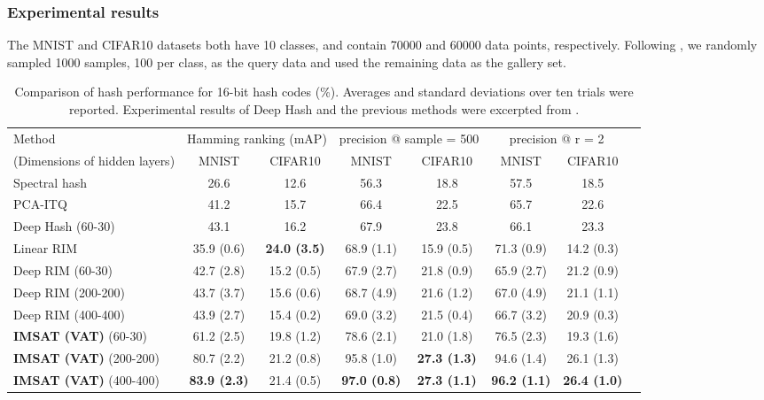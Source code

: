 \documentclass{article}
\theoremstyle{plain}
\begin{document}
\subsubsection{Experimental results} \label{sec:exp_hashing}
The MNIST and CIFAR10 datasets both have 10 classes, and contain 70000 and 60000 data points, respectively. 
Following \citet{erin2015deep}, we randomly sampled 1000 samples, 100 per class, as the query data and used the remaining data as the gallery set. 

\begin{table*}[t] 
\begin{center}
\caption{Comparison of hash performance for 16-bit hash codes (\%). Averages and standard deviations over ten trials were reported. Experimental results of Deep Hash and the previous methods were excerpted from \citet{erin2015deep}.}
\begin{tabular}{|l||c|c|c|c|c|c|c|}\hline
Method & \multicolumn{2}{|c|}{Hamming ranking (mAP)} &\multicolumn{2}{|c|}{precision @ sample = 500} & \multicolumn{2}{|c|}{precision @ r = 2} \\ \cline{2-7}
(Dimensions of hidden layers)             & MNIST & CIFAR10 & MNIST & CIFAR10 & MNIST & CIFAR10 \\ \hline
Spectral hash \citep{weiss2009spectral} & 26.6  &12.6  & 56.3 & 18.8  & 57.5  & 18.5  \\ \hline
PCA-ITQ \citep{gong2013iterative} & 41.2   & 15.7  & 66.4 & 22.5  & 65.7 &  22.6  \\ \hline
Deep Hash (60-30) &43.1  & 16.2  & 67.9 &  23.8  & 66.1  & 23.3   \\  \hline
Linear RIM  & 35.9 (0.6) & {\bf 24.0 (3.5)}  & 68.9 (1.1) &15.9 (0.5)  &71.3 (0.9)   & 14.2 (0.3)    \\ \hline
Deep RIM (60-30) & 42.7 (2.8)  & 15.2 (0.5)  & 67.9 (2.7)   &  21.8 (0.9)  &  65.9 (2.7)  & 21.2 (0.9)   \\ \hline
Deep RIM (200-200) &43.7 (3.7)  & 15.6 (0.6) &  68.7 (4.9) & 21.6 (1.2)  &  67.0 (4.9) &  21.1 (1.1)   \\ \hline
Deep RIM (400-400) &43.9 (2.7)  & 15.4 (0.2) &  69.0 (3.2) &  21.5 (0.4)  &  66.7 (3.2) & 20.9 (0.3)  \\ \hline
{\bf IMSAT (VAT)} (60-30)  & 61.2 (2.5) & 19.8 (1.2)  & 78.6 (2.1) & 21.0 (1.8)  & 76.5 (2.3)   &19.3 (1.6)      \\ \hline
{\bf IMSAT (VAT)} (200-200)  & 80.7 (2.2) &  21.2 (0.8)  & 95.8 (1.0) & {\bf 27.3 (1.3)}  & 94.6 (1.4)   & 26.1 (1.3)    \\ \hline
{\bf IMSAT (VAT)} (400-400)  & {\bf 83.9 (2.3)} & 21.4 (0.5)  & {\bf 97.0 (0.8)} & {\bf 27.3 (1.1)}   & {\bf 96.2 (1.1)}   &  {\bf 26.4 (1.0)}     \\ \hline
\end{tabular}
\label{table:hash_16}
\end{center}
\end{table*}
\end{document}
